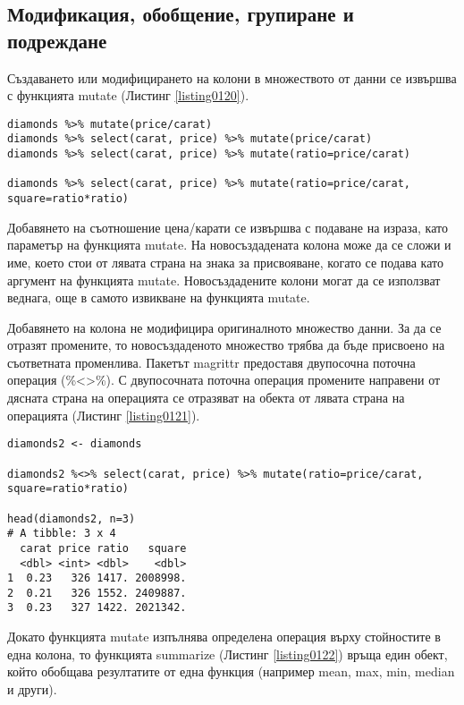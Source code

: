 \subsection{Модификация, обобщение, групиране и подреждане}

Създаването или модифицирането на колони в множеството от данни се извършва с функцията mutate (Листинг \ref{listing0120}). 

\begin{lstlisting}[caption=Модификация на колони, label=listing0120]
diamonds %>% mutate(price/carat)
diamonds %>% select(carat, price) %>% mutate(price/carat)
diamonds %>% select(carat, price) %>% mutate(ratio=price/carat)

diamonds %>% select(carat, price) %>% mutate(ratio=price/carat, square=ratio*ratio)
\end{lstlisting}

Добавянето на съотношение цена/карати се извършва с подаване на израза, като параметър на функцията mutate. На новосъздадената колона може да се сложи и име, което стои от лявата страна на знака за присвояване, когато се подава като аргумент на функцията mutate. Новосъздадените колони могат да се използват веднага, още в самото извикване на функцията mutate.

Добавянето на колона не модифицира оригиналното множество данни. За да се отразят промените, то новосъздаденото множество трябва да бъде присвоено на съответната променлива. Пакетът magrittr предоставя двупосочна поточна операция (\%<>\%). С двупосочната поточна операция промените направени от дясната страна на операцията се отразяват на обекта от лявата страна на операцията (Листинг \ref{listing0121}). 

\begin{lstlisting}[caption=Отразяване на модификациите, label=listing0121]
diamonds2 <- diamonds

diamonds2 %<>% select(carat, price) %>% mutate(ratio=price/carat, square=ratio*ratio)

head(diamonds2, n=3)
# A tibble: 3 x 4
  carat price ratio   square
  <dbl> <int> <dbl>    <dbl>
1  0.23   326 1417. 2008998.
2  0.21   326 1552. 2409887.
3  0.23   327 1422. 2021342.
\end{lstlisting}

Докато функцията mutate изпълнява определена операция върху стойностите в една колона, то функцията summarize (Листинг \ref{listing0122}) връща един обект, който обобщава резултатите от една функция (например mean, max, min, median и други).

